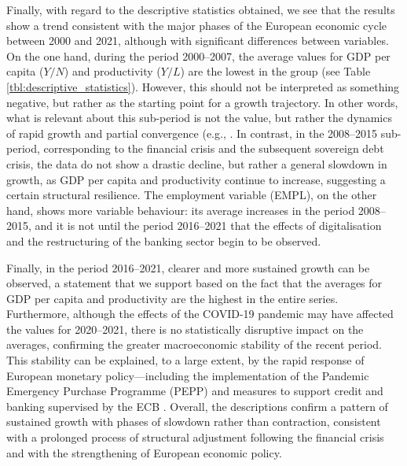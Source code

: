 \documentclass[a4paper,11pt,oneside]{article}
\begin{document}
Finally, with regard to the descriptive statistics obtained, we see that the results show a trend consistent with the major phases of the European economic cycle between 2000 and 2021, although with significant differences between variables. On the one hand, during the period 2000--2007, the average values for GDP per capita ($Y/N$) and productivity ($Y/L$) are the lowest in the group (see Table \ref{tbl:descriptive_statistics}). However, this should not be interpreted as something negative, but rather as the starting point for a growth trajectory. In other words, what is relevant about this sub-period is not the value, but rather the dynamics of rapid growth and partial convergence (e.g., \cite{cappelen2003impact}. In contrast, in the 2008--2015 sub-period, corresponding to the financial crisis and the subsequent sovereign debt crisis, the data do not show a drastic decline, but rather a general slowdown in growth, as GDP per capita and productivity continue to increase, suggesting a certain structural resilience. The employment variable (EMPL), on the other hand, shows more variable behaviour: its average increases in the period 2008–2015, and it is not until the period 2016–2021 that the effects of digitalisation and the restructuring of the banking sector begin to be observed.



Finally, in the period 2016--2021, clearer and more sustained growth can be observed, a statement that we support based on the fact that the averages for GDP per capita and productivity are the highest in the entire series. Furthermore, although the effects of the COVID-19 pandemic may have affected the values for 2020--2021, there is no statistically disruptive impact on the averages, confirming the greater macroeconomic stability of the recent period. This stability can be explained, to a large extent, by the rapid response of European monetary policy---including the implementation of the Pandemic Emergency Purchase Programme (PEPP) and measures to support credit and banking supervised by the ECB \citep{gortsos2020response, aguilar2020ecb}. Overall, the descriptions confirm a pattern of sustained growth with phases of slowdown rather than contraction, consistent with a prolonged process of structural adjustment following the financial crisis and with the strengthening of European economic policy.

\end{document}
